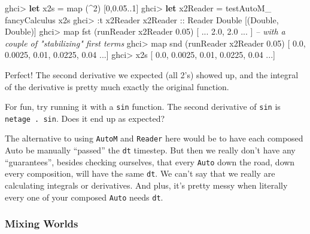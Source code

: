 \documentclass[]{article}
\newenvironment{Shaded}{}{}
\newcommand{\KeywordTok}[1]{\textcolor[rgb]{0.00,0.44,0.13}{\textbf{{#1}}}}
\newcommand{\DataTypeTok}[1]{\textcolor[rgb]{0.56,0.13,0.00}{{#1}}}
\newcommand{\DecValTok}[1]{\textcolor[rgb]{0.25,0.63,0.44}{{#1}}}
\newcommand{\FloatTok}[1]{\textcolor[rgb]{0.25,0.63,0.44}{{#1}}}
\newcommand{\CommentTok}[1]{\textcolor[rgb]{0.38,0.63,0.69}{\textit{{#1}}}}
\newcommand{\OtherTok}[1]{\textcolor[rgb]{0.00,0.44,0.13}{{#1}}}
\newcommand{\FunctionTok}[1]{\textcolor[rgb]{0.02,0.16,0.49}{{#1}}}
\newcommand{\NormalTok}[1]{{#1}}
\begin{document}
\begin{Shaded}
\begin{Highlighting}[]
\NormalTok{ghci}\FunctionTok{>} \KeywordTok{let} \NormalTok{x2s }\FunctionTok{=} \NormalTok{map (}\FunctionTok{^}\DecValTok{2}\NormalTok{) [}\DecValTok{0}\NormalTok{,}\FloatTok{0.05}\FunctionTok{..}\DecValTok{1}\NormalTok{]}
\NormalTok{ghci}\FunctionTok{>} \KeywordTok{let} \NormalTok{x2Reader }\FunctionTok{=} \NormalTok{testAutoM_ fancyCalculus x2s}
\NormalTok{ghci}\FunctionTok{>} \FunctionTok{:}\NormalTok{t x2Reader}
\OtherTok{x2Reader ::} \DataTypeTok{Reader} \DataTypeTok{Double} \NormalTok{[(}\DataTypeTok{Double}\NormalTok{, }\DataTypeTok{Double}\NormalTok{)]}
\NormalTok{ghci}\FunctionTok{>} \NormalTok{map fst (runReader x2Reader }\FloatTok{0.05}\NormalTok{)}
\NormalTok{[ }\FunctionTok{...} \FloatTok{2.0}\NormalTok{, }\FloatTok{2.0} \FunctionTok{...} \NormalTok{]    }\CommentTok{-- with a couple of "stabilizing" first terms}
\NormalTok{ghci}\FunctionTok{>} \NormalTok{map snd (runReader x2Reader }\FloatTok{0.05}\NormalTok{)}
\NormalTok{[ }\FloatTok{0.0}\NormalTok{, }\FloatTok{0.0025}\NormalTok{, }\FloatTok{0.01}\NormalTok{, }\FloatTok{0.0225}\NormalTok{, }\FloatTok{0.04} \FunctionTok{...}\NormalTok{]}
\NormalTok{ghci}\FunctionTok{>} \NormalTok{x2s}
\NormalTok{[ }\FloatTok{0.0}\NormalTok{, }\FloatTok{0.0025}\NormalTok{, }\FloatTok{0.01}\NormalTok{, }\FloatTok{0.0225}\NormalTok{, }\FloatTok{0.04} \FunctionTok{...}\NormalTok{]}
\end{Highlighting}
\end{Shaded}

Perfect! The second derivative we expected (all 2's) showed up, and the
integral of the derivative is pretty much exactly the original function.

For fun, try running it with a \texttt{sin} function. The second
derivative of \texttt{sin} is \texttt{netage\ .\ sin}. Does it end up as
expected?

The alternative to using \texttt{AutoM} and \texttt{Reader} here would
be to have each composed Auto be manually ``passed'' the \texttt{dt}
timestep. But then we really don't have any ``guarantees'', besides
checking ourselves, that every \texttt{Auto} down the road, down every
composition, will have the same \texttt{dt}. We can't say that we really
are calculating integrals or derivatives. And plus, it's pretty messy
when literally every one of your composed \texttt{Auto} needs
\texttt{dt}.

\subsubsection{Mixing Worlds}\label{mixing-worlds}
\end{document}

